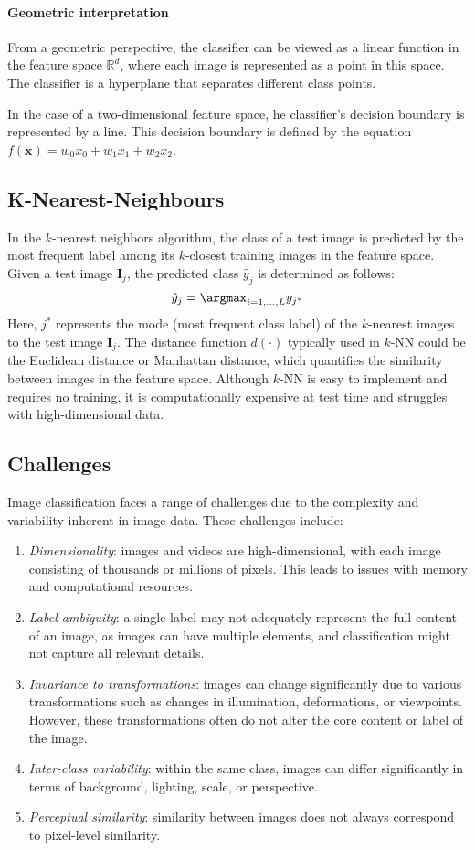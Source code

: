 \paragraph*{Geometric interpretation}
From a geometric perspective, the classifier can be viewed as a linear function in the feature space $\mathbb{R}^d$, where each image is represented as a point in this space. 
The classifier is a hyperplane that separates different class points.

In the case of a two-dimensional feature space, he classifier's decision boundary is represented by a line. 
This decision boundary is defined by the equation $f(\mathbf{x})=w_0x_0+w_1x_1+w_2x_2$.

\subsection{K-Nearest-Neighbours}
In the $k$-nearest neighbors algorithm, the class of a test image is predicted by the most frequent label among its $k$-closest training images in the feature space.
Given a test image $\mathbf{I}_j$, the predicted class $\hat{y}_j$ is determined as follows:
\[\hat{y}_j=\argmax_{i=1,\dots,L}y_{j^\ast}\]
Here, $j^\ast$ represents the mode (most frequent class label) of the $k$-nearest images to the test image $\mathbf{I}_j$. 
The distance function $d(\cdot)$ typically used in $k$-NN could be the Euclidean distance or Manhattan distance, which quantifies the similarity between images in the feature space.
Although $k$-NN is easy to implement and requires no training, it is computationally expensive at test time and struggles with high-dimensional data.

\subsection{Challenges}
Image classification faces a range of challenges due to the complexity and variability inherent in image data. 
These challenges include:
\begin{enumerate}
    \item \textit{Dimensionality}: images and videos are high-dimensional, with each image consisting of thousands or millions of pixels. 
        This leads to issues with memory and computational resources.
    \item \textit{Label ambiguity}: a single label may not adequately represent the full content of an image, as images can have multiple elements, and classification might not capture all relevant details. 
    \item \textit{Invariance to transformations}: images can change significantly due to various transformations such as changes in illumination, deformations, or viewpoints. 
        However, these transformations often do not alter the core content or label of the image.
    \item \textit{Inter-class variability}: within the same class, images can differ significantly in terms of background, lighting, scale, or perspective. 
    \item \textit{Perceptual similarity}: similarity between images does not always correspond to pixel-level similarity.
\end{enumerate}